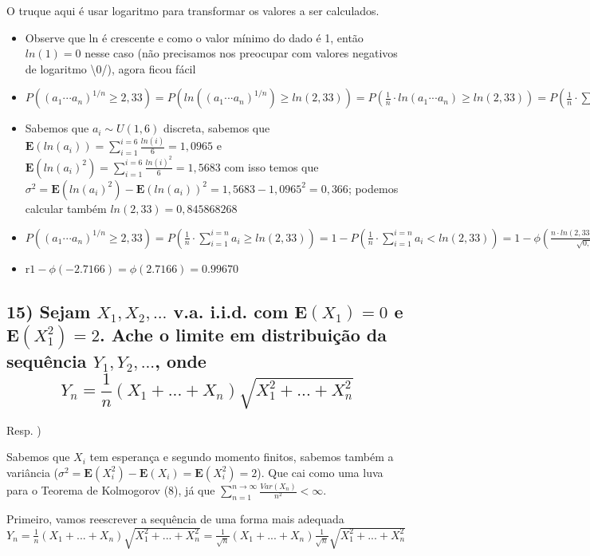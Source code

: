 \documentclass[portuguese]{article}
\begin{document}
O truque aqui é usar logaritmo para transformar os valores a ser calculados.
\begin{itemize}
\item Observe que ln é crescente e como o valor mínimo do dado é 1, então
$ln(1)=0$ nesse caso (não precisamos nos preocupar com valores negativos
de logaritmo \textbackslash{}0/), agora ficou fácil
\item $P((a_{1}\text{···}a_{n})^{1/n}\ge2,33)=P(ln((a_{1}\text{···}a_{n})^{1/n})\ge ln(2,33))=P(\frac{1}{n}\cdot ln(a_{1}\text{···}a_{n})\ge ln(2,33))=P(\frac{1}{n}\cdot\sum_{i=1}^{i=n}a_{i}\ge ln(2,33))$
\item Sabemos que $a_{i}\sim U(1,6)$ discreta, sabemos que $\mathbf{E}(ln(a_{i}))=\sum_{i=1}^{i=6}\frac{ln(i)}{6}=1,0965$
e $\mathbf{E}(ln(a_{i})^{2})=\sum_{i=1}^{i=6}\frac{ln(i)^{2}}{6}=1,5683$
com isso temos que $\sigma^{2}=\mathbf{E}(ln(a_{i})^{2})-\mathbf{E}(ln(a_{i}))^{2}=1,5683-1,0965^{2}=0,366$;
podemos calcular também $ln(2,33)=0,845868268$
\item $P((a_{1}\text{···}a_{n})^{1/n}\ge2,33)=P(\frac{1}{n}\cdot\sum_{i=1}^{i=n}a_{i}\ge ln(2,33))=1-P(\frac{1}{n}\cdot\sum_{i=1}^{i=n}a_{i}<ln(2,33))=1-\phi(\frac{n\cdot ln(2,33)-n\cdot1,0965}{\sqrt{0,366\cdot n}})=1-\phi(\frac{43\cdot ln(2,33)-43\cdot1,0965}{\sqrt{0,366\cdot43}})=$
\item r$1-\phi(-2.7166)=\phi(2.7166)=0.99670$
\end{itemize}

\subsection*{\textcompwordmark{}}


\subsection*{\textmd{15) Sejam $X_{1},X_{2},...$ v.a. i.i.d. com $\mathbf{E}(X_{1})=0$
e $\mathbf{E}(X_{1}^{2})=2$. Ache o limite em distribuição da sequência
$Y_{1},Y_{2},...$, onde 
\[
Y_{n}=\frac{1}{n}(X_{1}+...+X_{n})\sqrt{X_{1}^{2}+...+X_{n}^{2}}
\]
}}

Resp. ) 

Sabemos que $X_{i}$ tem esperança e segundo momento finitos, sabemos
também a variância ($\sigma^{2}=\mathbf{E}(X_{i}^{2})-\mathbf{E}(X_{i})=\mathbf{E}(X_{i}^{2})=2$).
Que cai como uma luva para o Teorema de Kolmogorov (8), já que $\sum_{n=1}^{n\to\infty}\frac{Var(X_{n})}{n^{2}}<\infty$.

Primeiro, vamos reescrever a sequência de uma forma mais adequada
$Y_{n}=\frac{1}{n}(X_{1}+...+X_{n})\sqrt{X_{1}^{2}+...+X_{n}^{2}}=\frac{1}{\sqrt{n}}(X_{1}+...+X_{n})\frac{1}{\sqrt{n}}\sqrt{X_{1}^{2}+...+X_{n}^{2}}$
\end{document}
